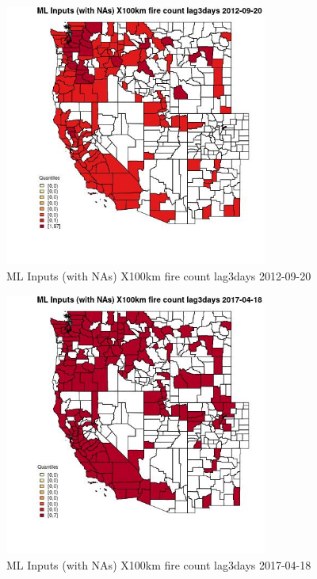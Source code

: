 \begin{figure} 
\centering  
\includegraphics[width=0.77\textwidth]{Code_Outputs/Report_ML_input_PM25_Step4_part_e_de_duplicated_aves_compiled_2019-05-14wNAs_CountyX100km_fire_count_lag3daysMean2012-09-20_2012-09-20.jpg} 
\caption{\label{fig:Report_ML_input_PM25_Step4_part_e_de_duplicated_aves_compiled_2019-05-14wNAsCountyX100km_fire_count_lag3daysMean2012-09-20_2012-09-20}ML Inputs (with NAs) X100km fire count lag3days 2012-09-20} 
\end{figure} 
 

\begin{figure} 
\centering  
\includegraphics[width=0.77\textwidth]{Code_Outputs/Report_ML_input_PM25_Step4_part_e_de_duplicated_aves_compiled_2019-05-14wNAs_CountyX100km_fire_count_lag3daysMean2017-04-18_2017-04-18.jpg} 
\caption{\label{fig:Report_ML_input_PM25_Step4_part_e_de_duplicated_aves_compiled_2019-05-14wNAsCountyX100km_fire_count_lag3daysMean2017-04-18_2017-04-18}ML Inputs (with NAs) X100km fire count lag3days 2017-04-18} 
\end{figure} 
 


